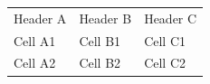 \documentclass{article}
\begin{document}
\begin{tabular}{lll}
Header A & Header B & Header C \\
Cell A1 & Cell B1 & Cell C1 \\
Cell A2 & Cell B2 & Cell C2 \\
\end{tabular}
\end{document}
